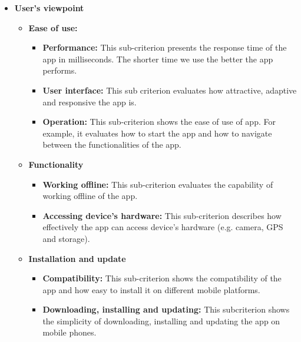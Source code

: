 \begin{itemize}
                \item\textbf{User’s viewpoint}
                \begin{itemize}
                    \item\textbf{Ease of use:}
                    \begin{itemize}
                        \item\textbf{Performance:} This sub-criterion presents the response time of the app in milliseconds. The shorter time we use the better the app performs.
                        \item\textbf{User interface:} This sub criterion evaluates how attractive, adaptive and responsive the app is.
                        \item\textbf{Operation:} This sub-criterion shows the ease of use of app. For example, it evaluates how to start the app and how to navigate between the functionalities of the app.
                    \end{itemize}
                    
                    \item\textbf{Functionality}
                    \begin{itemize}
                        \item\textbf{Working offline:} This sub-criterion evaluates the capability of working offline of the app.
                        \item\textbf{Accessing device’s hardware:} This sub-criterion describes how effectively the app can access device’s hardware (e.g. camera, GPS and storage).
                    \end{itemize}
                    
                    \item\textbf{Installation and update}
                    \begin{itemize}
                        \item\textbf{Compatibility:} This sub-criterion shows the compatibility of the app and how easy to install it on different mobile platforms.
                        \item\textbf{Downloading, installing and updating:} This subcriterion shows the simplicity of downloading, installing and updating the app on mobile phones.
                    \end{itemize}
                \end{itemize}
                    

\end{itemize}
